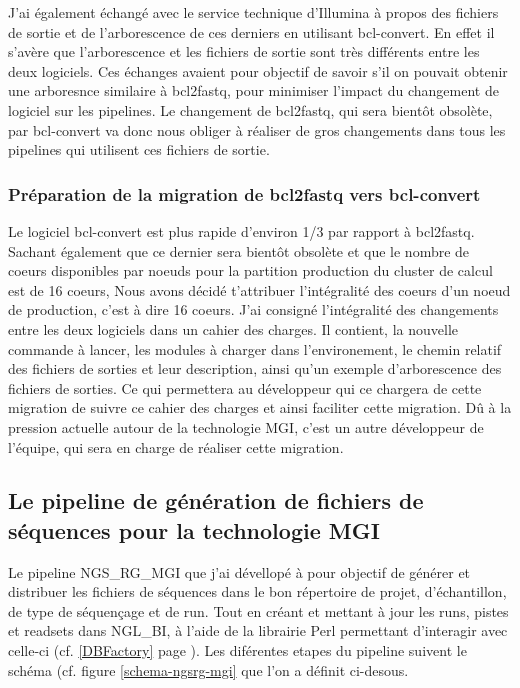 J'ai également échangé avec le service technique d'Illumina à propos des fichiers de sortie et de l'arborescence de ces derniers en utilisant bcl-convert. En effet il s'avère que l'arborescence et les fichiers de sortie sont très différents entre les deux logiciels. Ces échanges avaient pour objectif de savoir s'il on pouvait obtenir une arboresnce similaire à bcl2fastq, pour minimiser l'impact du changement de logiciel sur les pipelines. Le changement de bcl2fastq, qui sera bientôt obsolète, par bcl-convert va donc nous obliger à réaliser de gros changements dans tous les pipelines qui utilisent ces fichiers de sortie.

\subsubsection{Préparation de la migration de bcl2fastq vers bcl-convert}
Le logiciel bcl-convert est plus rapide d'environ 1/3 par rapport à bcl2fastq. Sachant également que ce dernier sera bientôt obsolète et que le nombre de coeurs disponibles par noeuds pour la partition \og production\fg{} du cluster de calcul est de 16 coeurs, Nous avons décidé t'attribuer l'intégralité des coeurs d'un noeud de \og production\fg{}, c'est à dire 16 coeurs. J'ai consigné l'intégralité des changements entre les deux logiciels dans un cahier des charges. Il contient, la nouvelle commande à lancer, les modules à charger dans l'environement, le chemin relatif des fichiers de sorties et leur description, ainsi qu'un exemple d'arborescence des fichiers de sorties. Ce qui permettera au développeur qui ce chargera de cette migration de suivre ce cahier des charges et ainsi faciliter cette migration. Dû à la pression actuelle autour de la technologie MGI, c'est un autre développeur de l'équipe, qui sera en charge de réaliser cette migration.


\subsection{Le pipeline de génération de fichiers de séquences pour la technologie MGI}
Le pipeline NGS\_RG\_MGI que j'ai dévellopé à pour objectif de générer et distribuer les fichiers de séquences dans le bon répertoire de projet, d'échantillon, de type de séquençage et de run.
Tout en créant et mettant à jour les runs, pistes et readsets dans NGL\_BI, à l'aide de la librairie Perl permettant d'interagir avec celle-ci (cf. \ref{DBFactory} page \pageref{DBFactory}). Les diférentes etapes du pipeline suivent le schéma (cf. figure \ref{schema-ngsrg-mgi} que l'on a définit ci-desous.

